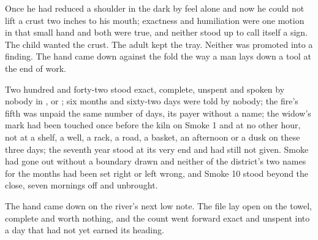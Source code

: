 Once he had reduced a shoulder in the dark by feel alone and now he could not lift a crust two inches to his mouth; exactness and humiliation were one motion in that small hand and both were true, and neither stood up to call itself a sign. The child wanted the crust. The adult kept the tray. Neither was promoted into a finding. The hand came down against the fold the way a man lays down a tool at the end of work.

Two hundred and forty-two stood exact, complete, unspent and spoken by nobody in ,  or ; six months and sixty-two days were told by nobody; the fire's fifth was unpaid the same number of days, its payer without a name; the widow's mark had been touched once before the kiln on Smoke 1 and at no other hour, not at a shelf, a well, a rack, a road, a basket, an afternoon or a dusk on these three days; the seventh year stood at its very end and had still not given. Smoke had gone out without a boundary drawn and neither of the district's two names for the months had been set right or left wrong, and Smoke 10 stood beyond the close, seven mornings off and unbrought.

The hand came down on the river's next low note. The file lay open on the towel, complete and worth nothing, and the count went forward exact and unspent into a day that had not yet earned its heading.
